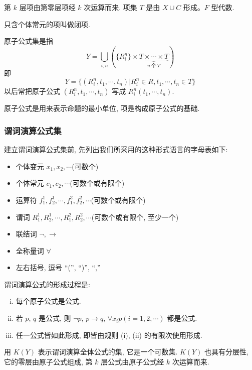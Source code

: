 \documentclass[
    color=black,
    device=normal,
    lang=cn
]{elegantnote}
\begin{document}
第 $k$ 层项由第零层项经 $k$ 次运算而来. 项集 $T$ 是由 $X\cup C$ 形成。$F$ 型代数.
\begin{definition}[闭项]
    只含个体常元的项叫做闭项.
\end{definition}
\begin{definition}[原子公式集]
    原子公式集是指
    $$
        Y=\bigcup_{i,n} \left(\{R_i^n\}\times \underbrace{T\times\cdots\times T}_{n\ \text{个}\ T} \right)
    $$
    即
    $$
        Y=\{(R_i^n, t_1, \cdots, t_n)\vert R_i^n\in R, t_1, \cdots, t_n \in T\}
    $$
    以后常把原子公式 $(R_i^n, t_1, \cdots, t_n)$ 写成 $R_i^n(t_1, \cdots, t_n)$.
\end{definition}
原子公式是用来表示命题的最小单位, 项是构成原子公式的基础.
\subsubsection{谓词演算公式集}
建立谓词演算公式集前, 先列出我们所采用的这种形式语言的字母表如下:
\begin{itemize}[listparindent = 2em]
    \item 个体变元 $x_1, x_2, \cdots$\hfill (可数个)
    \item 个体常元 $c_1, c_2, \cdots$\hfill (可数个或有限个)
    \item 运算符 $f_1^1, f_2^1, \cdots, f_1^2, f_2^2, \cdots$\hfill (可数个或有限个)
    \item 谓词 $R_1^1, R_2^1, \cdots, R_1^2, R_2^2, \cdots$\hfill (可数个或有限个, 至少一个)
    \item 联结词 $\lnot, \to$
    \item 全称量词 $\forall$
    \item 左右括号, 逗号 ``('', ``)'', ``,''
\end{itemize}
谓词演算公式的形成过程是:
\begin{enumerate}[(i)]
    \item 每个原子公式是公式.
    \item 若 $p$, $q$ 是公式, 则 $\lnot p$, $p\to q$, $\forall x_i p(i = 1, 2, \cdots)$ 都是公式.
    \item 任一公式皆如此形成, 即皆由规则 (i), (ii) 的有限次使用形成.
\end{enumerate}
用 $K(Y)$ 表示谓词演算全体公式的集, 它是一个可数集. $K(Y)$ 也具有分层性, 它的零层由原子公式组成, 第 $k$ 层公式由原子公式经 $k$ 次运算而来.
\end{document}

